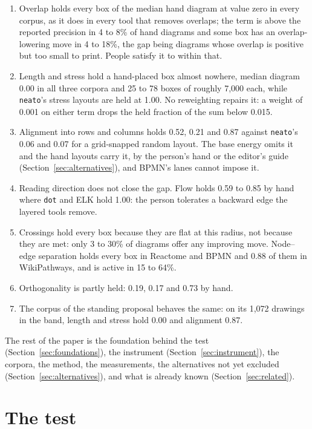 \documentclass[11pt]{article}
\begin{document}
\begin{enumerate}\itemsep2pt
\item Overlap holds every box of the median hand diagram at value zero in every corpus, as
  it does in every tool that removes overlaps; the term is above the reported precision in
  4 to 8\% of hand diagrams and some box has an overlap-lowering move in 4 to 18\%, the
  gap being diagrams whose overlap is positive but too small to print. People satisfy it
  to within that.
\item Length and stress hold a hand-placed box almost nowhere, median diagram 0.00 in all
  three corpora and 25 to 78 boxes of roughly 7{,}000 each, while
  \texttt{neato}'s stress layouts are held at 1.00. No reweighting repairs it: a weight of
  0.001 on either term drops the held fraction of the sum below 0.015.
\item Alignment into rows and columns holds 0.52, 0.21 and 0.87 against \texttt{neato}'s
  0.06 and 0.07 for a grid-snapped random layout. The base energy omits it and the hand
  layouts carry it, by the person's hand or the editor's guide
  (Section~\ref{sec:alternatives}), and BPMN's lanes cannot impose it.
\item Reading direction does not close the gap. Flow holds 0.59 to 0.85 by hand where
  \texttt{dot} and ELK hold 1.00: the person tolerates a backward edge the layered tools
  remove.
\item Crossings hold every box because they are flat at this radius, not because they are
  met: only 3 to 30\% of diagrams offer any improving move. Node--edge separation holds
  every box in Reactome and BPMN and 0.88 of them in WikiPathways, and is active in 15 to
  64\%.
\item Orthogonality is partly held: 0.19, 0.17 and 0.73 by hand.
\item The corpus of the standing proposal behaves the same: on its 1{,}072 drawings in
  the band, length and stress hold 0.00 and alignment 0.87.
\end{enumerate}

The rest of the paper is the foundation behind the test (Section~\ref{sec:foundations}),
the instrument (Section~\ref{sec:instrument}), the corpora, the method, the measurements,
the alternatives not yet excluded (Section~\ref{sec:alternatives}), and what is already
known (Section~\ref{sec:related}).


\section{The test}\label{sec:test}
\end{document}
